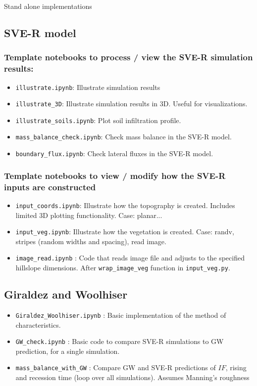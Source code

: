 \documentclass{article}
\newcommand{\code}[1]{\texttt{#1}}
\begin{document}
Stand alone implementations


\subsection{SVE-R model}
\subsubsection*{Template notebooks to process / view the SVE-R simulation results:}
\begin{itemize}
	\item \code{illustrate.ipynb}: Illustrate simulation results
	\item \code{illustrate\_3D}:  Illustrate simulation results in 3D.  Useful for visualizations.
	\item \code{illustrate\_soils.ipynb}: Plot soil infiltration profile. 
	\item \code{mass\_balance\_check.ipynb}: Check mass balance in the SVE-R model. 
	\item \code{boundary\_flux.ipynb}: Check lateral fluxes in the SVE-R model. 
\end{itemize}

\subsubsection*{Template notebooks to view / modify how the SVE-R inputs are constructed}
\begin{itemize}
	\item \code{input\_coords.ipynb}:  Illustrate how the topography is created. Includes limited 3D plotting functionality. Case: planar...
	\item \code{input\_veg.ipynb}:  Illustrate how the vegetation is created. Case: randv, stripes (random widths and spacing), read image.
	\item \code{image\_read.ipynb} : Code that reads image file and adjusts to the specified hillslope dimensions.  After \code{wrap\_image\_veg} function in \code{input\_veg.py}.
\end{itemize}



\subsection{Giraldez and Woolhiser }
\begin{itemize}
	\item \code{Giraldez\_Woolhiser.ipynb} : Basic implementation of the method of characteristics.
	\item \code{GW\_check.ipynb} : Basic code to compare SVE-R simulations to GW prediction, for a single simulation.  
	\item \code{mass\_balance\_with\_GW} : Compare GW and SVE-R predictions of $IF$, rising and recession time (loop over all simulations).  
	\subitem Assumes Manning's roughness
\end{itemize}
\end{document}
